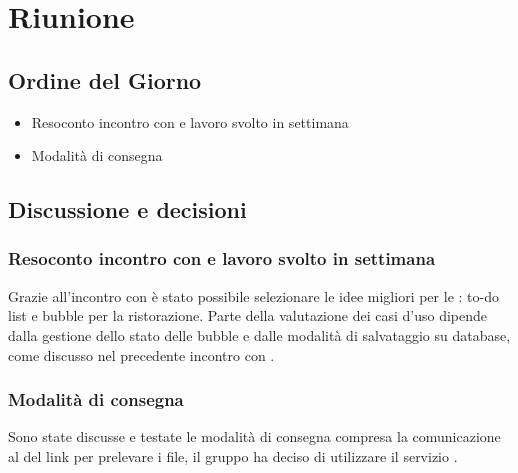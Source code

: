 
\section{Riunione}
\subsection{Ordine del Giorno}
\begin{itemize}
	\item Resoconto incontro con \Proponente e lavoro svolto in settimana 
	\item Modalità di consegna
\end{itemize}

\subsection{Discussione e decisioni}
\subsubsection{Resoconto incontro con \Proponente e lavoro svolto in settimana}
Grazie all'incontro con \Proponente è stato possibile selezionare le idee migliori per le : to-do list e bubble per la ristorazione. Parte della valutazione dei casi d'uso dipende dalla gestione dello stato delle bubble e dalle modalità di salvataggio su database, come discusso nel precedente incontro con \Proponente. 

\subsubsection{Modalità di consegna}
Sono state discusse e testate le modalità di consegna compresa la comunicazione al \Committente{} del link per prelevare i file, il gruppo ha deciso di utilizzare il servizio . 

\clearpage
